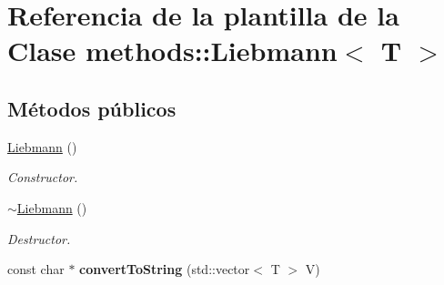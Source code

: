 \hypertarget{classmethods_1_1Liebmann}{}\section{Referencia de la plantilla de la Clase methods\+:\+:Liebmann$<$ T $>$}
\label{classmethods_1_1Liebmann}
\subsection*{Métodos públicos}
\begin{DoxyCompactItemize}
\item 
\hyperlink{classmethods_1_1Liebmann_a7a095aca7a7556f4eec22c2c3528f436}{Liebmann} ()\hypertarget{classmethods_1_1Liebmann_a7a095aca7a7556f4eec22c2c3528f436}{}\label{classmethods_1_1Liebmann_a7a095aca7a7556f4eec22c2c3528f436}

\begin{DoxyCompactList}\small\item\em Constructor. \end{DoxyCompactList}\item 
\hyperlink{classmethods_1_1Liebmann_a2f2d48f06aeb92dcbcb0e73774ffb200}{$\sim$\+Liebmann} ()\hypertarget{classmethods_1_1Liebmann_a2f2d48f06aeb92dcbcb0e73774ffb200}{}\label{classmethods_1_1Liebmann_a2f2d48f06aeb92dcbcb0e73774ffb200}

\begin{DoxyCompactList}\small\item\em Destructor. \end{DoxyCompactList}\item 
const char $\ast$ {\bfseries convert\+To\+String} (std\+::vector$<$ T $>$ V)\hypertarget{classmethods_1_1Liebmann_aa08c0ff64a59ca72fbb3d1d4d0e690bc}{}\label{classmethods_1_1Liebmann_aa08c0ff64a59ca72fbb3d1d4d0e690bc}


\end{DoxyCompactItemize}
